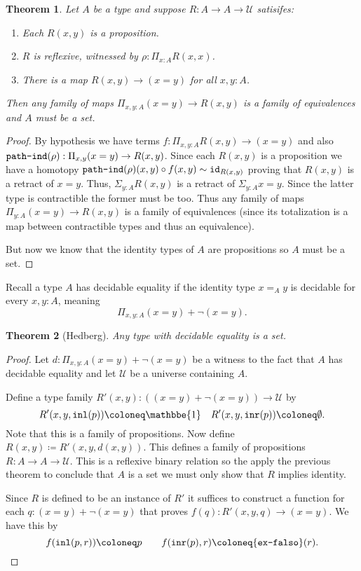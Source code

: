 \documentclass{amsart}
\theoremstyle{theorem}
\newtheorem*{thm}{Theorem}
\theoremstyle{definition}
\theoremstyle{remark}
\newcommand{\0}{\mathbbe{0}}
\newcommand{\1}{\mathbbe{1}}
\newcommand{\2}{\mathbbe{2}}
\newcommand{\3}{\mathbbe{3}}
\newcommand{\4}{\mathbbe{4}}
\newcommand{\term}[1]{{\textup{\texttt{#1}}}}
\newcommand{\id}{\term{id}}
\newcommand{\inl}{\term{inl}}
\newcommand{\inr}{\term{inr}}
\newcommand{\UU}{{\mathcal{U}}}
\begin{document}
\begin{thm} Let $A$ be a type and suppose $R \colon A \to A \to \UU$ satisifes:
\begin{enumerate}
\item Each $R(x,y)$ is a proposition.
\item $R$ is reflexive, witnessed by $\rho : \Pi_{x:A} R(x,x)$.
\item There is a map $R(x,y) \to (x=y)$ for all $x,y:A$.
\end{enumerate}
Then any family of maps $\Pi_{x,y:A} (x=y) \to R(x,y)$ is a family of equivalences and $A$ must be a set.
\end{thm}
\begin{proof}
By hypothesis we have terms $f : \Pi_{x,y:A} R(x,y) \to (x=y)$ and also $\term{path-ind}(\rho) : \Pi_{x,y} (x=y) \to R(x,y)$. Since each $R(x,y)$ is a proposition we have a homotopy $\term{path-ind}(\rho)(x,y) \circ f(x,y) \sim \id_{R(x,y)}$ proving that $R(x,y)$ is a retract of $x=y$. Thus, $\Sigma_{y:A} R(x,y)$ is a retract of $\Sigma_{y:A} x=y$. Since the latter type is contractible the former must be too. Thus any family of maps $\Pi_{y:A}(x=y) \to R(x,y)$ is a family of equivalences (since its totalization is a map between contractible types and thus an equivalence). 

But now we know that the identity types of $A$ are propositions so $A$ must be a set.
\end{proof}

Recall a type $A$ has decidable equality  if the identity type $x=_Ay$ is decidable for every $x, y : A$, meaning
\[ \Pi_{x,y:A} (x=y) + \neg (x=y).\]

\begin{thm}[Hedberg] Any type with decidable equality is a set.
\end{thm}
\begin{proof} Let $d : \Pi_{x,y:A} (x=y) + \neg (x=y)$ be a witness to the fact that $A$ has decidable equality and let $\UU$ be a universe containing $A$.

Define a type family $R'(x,y) : ((x=y) +\neg(x=y)) \to \UU$ by
\[ R'(x,y, \inl(p)) \coloneq \1 \quad R'(x,y, \inr(p)) \coloneq \emptyset.\]
Note that this is a family of propositions. Now define $R(x,y) \coloneq R'(x,y,d(x,y))$. This defines a family of propositions $R : A \to A \to \UU$. This is a reflexive binary relation so the apply the previous theorem to conclude that $A$ is a set we must only show that $R$ implies identity. 

Since $R$ is defined to be an instance of $R'$ it suffices to construct a function for each $q : (x=y) + \neg(x=y)$ that proves $f(q) : R'(x,y,q) \to (x=y)$. We have this by
\[ f(\inl(p,r)) \coloneq p \qquad f(\inr(p),r) \coloneq \term{ex-falso}(r). \qedhere\]
\end{proof}
\end{document}
